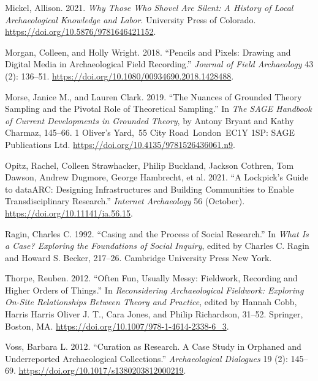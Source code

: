 \documentclass[
]{article}
\newlength{\cslhangindent}
\newenvironment{CSLReferences}[2] %
 {\begin{list}{}{%
  \setlength{\itemindent}{0pt}
  \setlength{\leftmargin}{0pt}
  \setlength{\parsep}{0pt}
  \ifodd #1
   \setlength{\leftmargin}{\cslhangindent}
   \setlength{\itemindent}{-1\cslhangindent}
  \fi
  \setlength{\itemsep}{#2\baselineskip}}}
 {\end{list}}
\begin{document}
\begin{CSLReferences}{1}{0}
Mickel, Allison. 2021. \emph{Why {Those Who Shovel Are Silent}: {A
History} of {Local Archaeological Knowledge} and {Labor}}. University
Press of Colorado. \url{https://doi.org/10.5876/9781646421152}.

Morgan, Colleen, and Holly Wright. 2018. {``Pencils and {Pixels}:
{Drawing} and {Digital Media} in {Archaeological Field Recording}.''}
\emph{Journal of Field Archaeology} 43 (2): 136--51.
\url{https://doi.org/10.1080/00934690.2018.1428488}.

Morse, Janice M., and Lauren Clark. 2019. {``The {Nuances} of {Grounded
Theory Sampling} and the {Pivotal Role} of {Theoretical Sampling}.''} In
\emph{The {SAGE Handbook} of {Current Developments} in {Grounded
Theory}}, by Antony Bryant and Kathy Charmaz, 145--66. 1 Oliver's
Yard,~55 City Road~London~EC1Y 1SP: SAGE Publications Ltd.
\url{https://doi.org/10.4135/9781526436061.n9}.

Opitz, Rachel, Colleen Strawhacker, Philip Buckland, Jackson Cothren,
Tom Dawson, Andrew Dugmore, George Hambrecht, et al. 2021. {``A
{Lockpick}'s {Guide} to {dataARC}: {Designing Infrastructures} and
{Building Communities} to {Enable Transdisciplinary Research}.''}
\emph{Internet Archaeology} 56 (October).
\url{https://doi.org/10.11141/ia.56.15}.

Ragin, Charles C. 1992. {``Casing and the Process of Social Research.''}
In \emph{What Is a {Case}? {Exploring} the {Foundations} of {Social
Inquiry}}, edited by Charles C. Ragin and Howard S. Becker, 217--26.
Cambridge University Press New York.

Thorpe, Reuben. 2012. {``Often {Fun}, {Usually Messy}: {Fieldwork},
{Recording} and {Higher Orders} of {Things}.''} In \emph{Reconsidering
{Archaeological Fieldwork}: {Exploring On-Site Relationships Between
Theory} and {Practice}}, edited by Hannah Cobb, Harris Harris Oliver J.
T., Cara Jones, and Philip Richardson, 31--52. Springer, Boston, MA.
\url{https://doi.org/10.1007/978-1-4614-2338-6_3}.

Voss, Barbara L. 2012. {``Curation as Research. {A} Case Study in
Orphaned and Underreported Archaeological Collections.''}
\emph{Archaeological Dialogues} 19 (2): 145--69.
\url{https://doi.org/10.1017/s1380203812000219}.


\end{CSLReferences}
\end{document}
